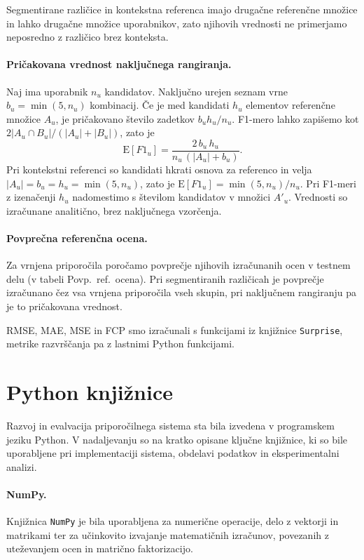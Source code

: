 \documentclass[a4paper,twoside,openright,12pt,slovene]{book}
\begin{document}
Segmentirane različice in kontekstna referenca imajo drugačne referenčne množice
in lahko drugačne množice uporabnikov, zato njihovih vrednosti
ne primerjamo neposredno z različico brez konteksta.

\paragraph{Pričakovana vrednost naključnega rangiranja.}
Naj ima uporabnik $n_u$ kandidatov. Naključno urejen seznam vrne
$b_u=\min(5,n_u)$ kombinacij. Če je med kandidati $h_u$ elementov
referenčne množice $A_u$, je pričakovano število zadetkov
$b_u h_u/n_u$. F1-mero lahko zapišemo kot
$2|A_u\cap B_u|/(|A_u|+|B_u|)$, zato je
\begin{equation}
\mathrm{E}[F1_u] = \frac{2\,b_u\,h_u}{n_u\,(|A_u|+b_u)} .
\label{eq:random_f1}
\end{equation}
Pri kontekstni referenci so kandidati hkrati osnova za referenco
in velja $|A_u|=b_u=h_u=\min(5,n_u)$, zato je
$\mathrm{E}[F1_u]=\min(5,n_u)/n_u$. Pri F1-meri z izenačenji $h_u$
nadomestimo s številom kandidatov v množici $A'_u$. Vrednosti so
izračunane analitično, brez naključnega vzorčenja.

\paragraph{Povprečna referenčna ocena.}
Za vrnjena priporočila poročamo povprečje njihovih izračunanih
ocen v testnem delu (v tabeli Povp.\ ref.\ ocena). Pri segmentiranih
različicah je povprečje izračunano čez vsa vrnjena priporočila
vseh skupin, pri naključnem rangiranju pa je to pričakovana vrednost.

RMSE, MAE, MSE in FCP smo izračunali s funkcijami iz knjižnice \texttt{Surprise}, metrike razvrščanja pa z lastnimi Python funkcijami.

\section{Python knjižnice} \label{sec:python_libraries}

Razvoj in evalvacija priporočilnega sistema sta bila izvedena v programskem jeziku Python. V nadaljevanju so na kratko opisane ključne knjižnice, ki so bile uporabljene pri implementaciji sistema, obdelavi podatkov in eksperimentalni analizi.

\paragraph{NumPy.}
Knjižnica \texttt{NumPy} je bila uporabljena za numerične operacije, delo z vektorji in matrikami ter za učinkovito izvajanje matematičnih izračunov, povezanih z uteževanjem ocen in matrično faktorizacijo.
\end{document}
